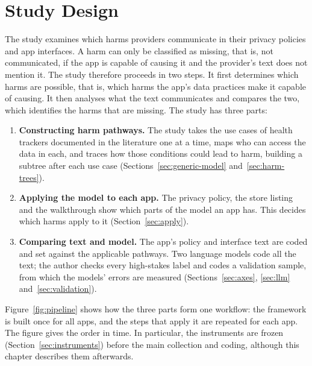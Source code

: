\section{Study Design}
\label{sec:design}
The study examines which harms providers communicate in their privacy policies and app
interfaces. A harm can only be classified as missing, that is, not communicated, if the app is
capable of causing it and the provider's text does not mention it. The study therefore proceeds
in two steps. It first determines which harms are possible, that is, which harms the app's data
practices make it capable of causing. It then analyses what the text communicates and compares
the two, which identifies the harms that are missing. The study has three parts:
\begin{enumerate}[itemsep=1pt,topsep=3pt]
  \item \textbf{Constructing harm pathways.} The study takes the use cases of health trackers
    documented in the literature one at a time, maps who can access the data in each, and
    traces how those conditions could lead to harm, building a subtree after each use case
    (Sections~\ref{sec:generic-model} and~\ref{sec:harm-trees}).
  \item \textbf{Applying the model to each app.} The privacy policy, the store
    listing and the walkthrough show which parts of the model an app has. This
    decides which harms apply to it (Section~\ref{sec:apply}).
  \item \textbf{Comparing text and model.} The app's policy and interface text are
    coded and set against the applicable pathways. Two language models code all the
    text; the author checks every high-stakes label and codes a validation sample, from
    which the models' errors are measured (Sections~\ref{sec:axes}, \ref{sec:llm}
    and~\ref{sec:validation}).
\end{enumerate}
Figure~\ref{fig:pipeline} shows how the three parts form one workflow: the framework is
built once for all apps, and the steps that apply it are repeated for each app. The figure gives
the order in time. In particular, the instruments are frozen
(Section~\ref{sec:instruments}) before the main collection and coding, although this chapter
describes them afterwards.


